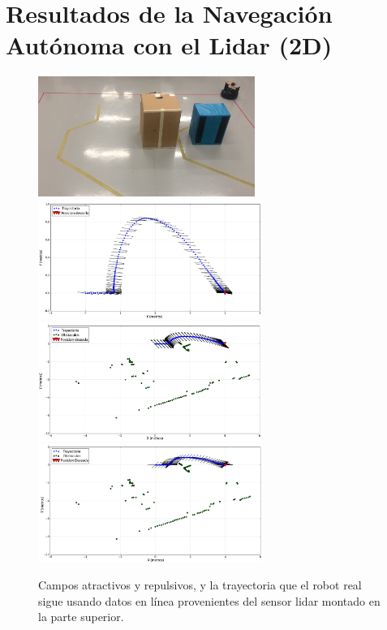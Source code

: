 \section{Resultados de la Navegación Autónoma con el Lidar (2D)}
\begin{figure}%
  \centering \footnotesize
  \includegraphics[width=0.63\textwidth]{images/kobuki_201.jpg}
  \includegraphics[width=0.65\textwidth]{images/fattr_lidar_s.png}
  \includegraphics[width=0.65\textwidth]{images/frep_lidar_s.png}
  \includegraphics[width=0.65\textwidth]{images/fnav_lidar_s.png}
  \captionsetup{font=footnotesize}
  \caption{Campos atractivos y repulsivos, y la trayectoria que el robot real sigue 
  usando datos en línea provenientes del sensor lidar montado en la parte superior.}
  \label{f:kbki_autonomo}
\end{figure}
